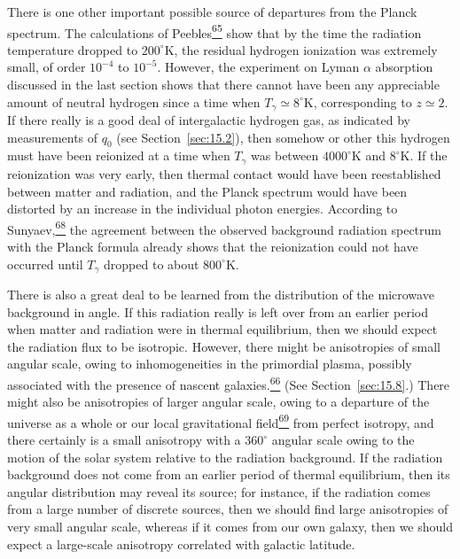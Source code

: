 There is one other important possible source of departures from the Planck
spectrum. The calculations of Peebles\hyperref[ch15-ref-65]{\textsuperscript{65}}
show that by the time the radiation temperature dropped to
\(200^\circ\mathrm{K}\), the residual hydrogen ionization was extremely small,
of order \(10^{-4}\) to \(10^{-5}\). However, the experiment on Lyman
\(\alpha\) absorption discussed in the last section shows that there cannot
have been any appreciable amount of neutral hydrogen since a time when
\(T_\gamma\simeq8^\circ\mathrm{K}\), corresponding to \(z\simeq2\). If there
really is a good deal of intergalactic hydrogen gas, as indicated by
measurements of \(q_0\) (see Section~\ref{sec:15.2}), then somehow or other
this hydrogen must have been reionized at a time when \(T_\gamma\) was between
\(4000^\circ\mathrm{K}\) and \(8^\circ\mathrm{K}\). If the reionization was
very early, then thermal contact would have been reestablished between matter
and radiation, and the Planck spectrum would have been distorted by an
increase in the individual photon energies. According to
Sunyaev,\hyperref[ch15-ref-68]{\textsuperscript{68}} the agreement between the
observed background radiation spectrum with the Planck formula already shows
that the reionization could not have occurred until \(T_\gamma\) dropped to
about \(800^\circ\mathrm{K}\).

There is also a great deal to be learned from the distribution of the
microwave background in angle. If this radiation really is left over from an
earlier period when matter and radiation were in thermal equilibrium, then we
should expect the radiation flux to be isotropic. However, there might be
anisotropies of small angular scale, owing to inhomogeneities in the primordial
plasma, possibly associated with the presence of nascent
galaxies.\hyperref[ch15-ref-66]{\textsuperscript{66}} (See
Section~\ref{sec:15.8}.) There might also be anisotropies of larger angular
scale, owing to a departure of the universe as a whole or our local
gravitational field\hyperref[ch15-ref-69]{\textsuperscript{69}} from perfect
isotropy, and there certainly is a small anisotropy with a \(360^\circ\)
angular scale owing to the motion of the solar system relative to the radiation
background. If the radiation background does not come from an earlier period
of thermal equilibrium, then its angular distribution may reveal its source;
for instance, if the radiation comes from a large number of discrete sources,
then we should find large anisotropies of very small angular scale, whereas if
it comes from our own galaxy, then we should expect a large-scale anisotropy
correlated with galactic latitude.

